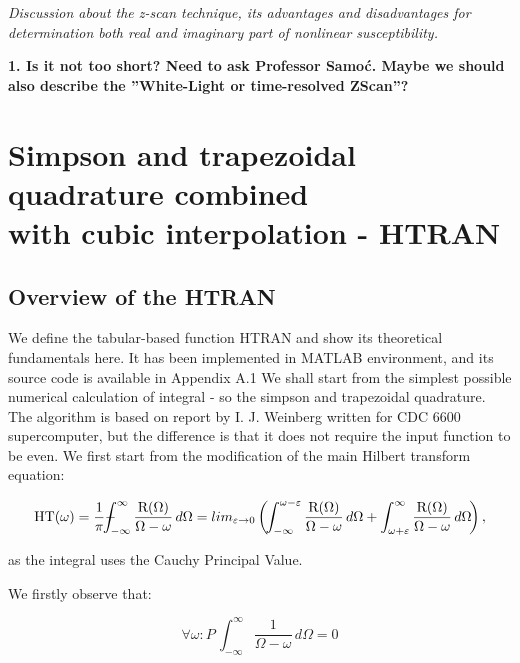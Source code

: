 \documentclass[12pt,twoside,a4paper]{article}
\def\emptyline{\vspace{12pt}}
\numberwithin{equation}{subsection}
\numberwithin{figure}{subsection}
\def\Xint#1{\mathchoice
{\XXint\displaystyle\textstyle{#1}}%
{\XXint\textstyle\scriptstyle{#1}}%
{\XXint\scriptstyle\scriptscriptstyle{#1}}%
{\XXint\scriptscriptstyle\scriptscriptstyle{#1}}%
\!\int}
\def\XXint#1#2#3{{\setbox0=\hbox{$#1{#2#3}{\int}$ }\vcenter{\hbox{$#2#3$ }}\kern-.6\wd0}}
\def\dashint{\Xint-}
\begin{document}
\textit{Discussion about the z-scan technique, its advantages and disadvantages for determination both real and imaginary part of
nonlinear susceptibility.}

\textbf{1. Is it not too short? Need to ask Professor Samoć. Maybe we should also describe the ''White-Light or time-resolved ZScan''?}  

\section{Simpson and trapezoidal quadrature com\-bi\-ned \\ with cu\-bic in\-ter\-po\-la\-tion - HTRAN}
\label{chap:htran}

\subsection{Overview of the HTRAN} \label{chap:htran_overview}


We define the tabular-based function HTRAN and show its theoretical fundamentals here. It has been implemented in MATLAB environment,
and its source code is available in Appendix A.1 We shall start from the simplest possible numerical calculation of
integral - so the simpson and trapezoidal quadrature. The algorithm is based on report by I. J. Weinberg \cite{weinberg_hilbert} written for CDC
6600 supercomputer, but the difference is that it does not require the input function to be even. We first start from the
modification of the main Hilbert transform equation:

\begin{equation} \label{eq:htran_first_modification}
  \mathrm{HT}(\omega )=\frac{1}{\pi } {\dashint_{ - \infty }^{\infty } \frac {\mathrm{R}(\Omega )}{\Omega  - \omega }\,d\Omega }
  = {lim_{\varepsilon \rightarrow 0}} \left(  \! \int_{ - \infty }^{\omega  - \varepsilon }\frac {\mathrm{R}(\Omega )}{\Omega  -
  \omega }\,d\Omega  + \int_{\omega  + \varepsilon }^{\infty }\frac {\mathrm{R}(\Omega )}{\Omega  - \omega }\,d\Omega \!  \right),
\end{equation} 

as the integral uses the Cauchy Principal Value. 

\emptyline

We firstly observe that:

\begin{equation} \label{eq:htran_observation0}
  \forall \omega : P\,\int_{ - \infty }^{\infty }\frac {1}{\Omega  - \omega }\,d\Omega =0
\end{equation}
\end{document}

